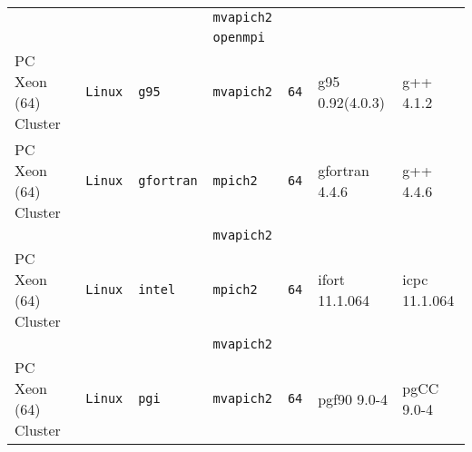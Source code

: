 \begin{longtable}{lllllll}
                      &           &                 &\tt mvapich2   &                    &                                    &                                 \\
                      &           &                 &\tt openmpi    &                    &                                    &                                 \\
PC Xeon (64) Cluster  &\tt Linux  &\tt g95          &\tt mvapich2   &\tt 64              & g95 \footnotesize 0.92(4.0.3)      & g++ \footnotesize 4.1.2         \\ %
PC Xeon (64) Cluster  &\tt Linux  &\tt gfortran     &\tt mpich2     &\tt 64              & gfortran \footnotesize 4.4.6       & g++ \footnotesize 4.4.6         \\ %
                      &           &                 &\tt mvapich2   &                    &                                    &                                 \\
PC Xeon (64) Cluster  &\tt Linux  &\tt intel        &\tt mpich2     &\tt 64              & ifort \footnotesize 11.1.064       & icpc \footnotesize 11.1.064     \\ %
                      &           &                 &\tt mvapich2   &                    &                                    &                                 \\
PC Xeon (64) Cluster  &\tt Linux  &\tt pgi          &\tt mvapich2   &\tt 64              & pgf90 \footnotesize 9.0-4          & pgCC \footnotesize 9.0-4        \\ %

\end{longtable}
